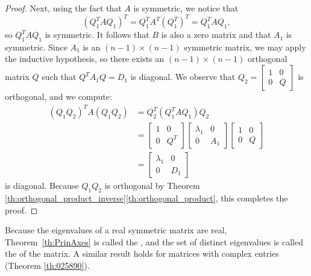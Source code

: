 \documentclass{ximera}
\begin{document}
\begin{proof}
Next, using the fact that $A$ is symmetric, we notice that
$$(Q_{1}^TAQ_{1})^T = Q_{1}^T A^T (Q_{1}^T)^T = Q_{1}^TAQ_{1},$$ so $Q_{1}^TAQ_{1}$ is symmetric.  It follows that $B$ is also a zero matrix and that $A_{1}$ is symmetric.  Since $A_{1}$ is an $(n - 1) \times (n - 1)$ symmetric matrix, we may apply the inductive hypothesis, so there exists an $(n - 1) \times (n - 1)$ orthogonal matrix $Q$ such that $Q^{T}A_{1}Q = D_{1}$ is diagonal. We observe that $Q_{2} = \begin{bmatrix}
 1 & 0\\
 0 & Q
 \end{bmatrix}$
 is orthogonal, and we compute:
\begin{align*}
(Q_{1}Q_{2})^TA(Q_{1}Q_{2}) &= Q_{2}^T(Q_{1}^TAQ_{1})Q_{2} \\
&= \begin{bmatrix}
1 & 0 \\
0 & Q^T
\end{bmatrix} \begin{bmatrix}
\lambda_{1} & 0 \\
0 & A_{1}
\end{bmatrix}\begin{bmatrix}
1 & 0 \\
0 & Q
\end{bmatrix}\\
&= \begin{bmatrix}
\lambda_{1} & 0 \\
0 & D_{1}
\end{bmatrix}
\end{align*}
is diagonal. Because $Q_{1}Q_{2}$ is orthogonal by Theorem \ref{th:orthogonal_product_inverse}\ref{th:orthogonal_product}, this completes the proof.
\end{proof}


Because the eigenvalues of a real symmetric matrix are real, Theorem~\ref{th:PrinAxes} is called the , and the set of distinct eigenvalues is called the  of the matrix. A similar result holds for matrices with complex entries (Theorem \ref{th:025890}).
\end{document}
